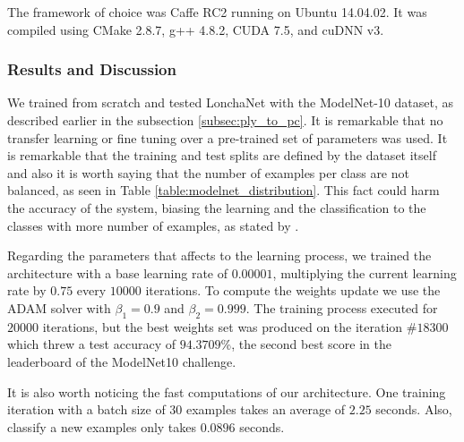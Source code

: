 The framework of choice was Caffe RC2 running on Ubuntu 14.04.02. It was compiled using CMake 2.8.7, g++ 4.8.2, CUDA 7.5, and cuDNN v3.

\subsubsection{Results and Discussion}
\label{cha:objrecog:sec:lonchanet:subsec:experiments:subsubsec:results}

We trained from scratch and tested LonchaNet with the ModelNet-10 dataset, as described earlier in the subsection \ref{subsec:ply_to_pc}. It is remarkable that no transfer learning or fine tuning over a pre-trained set of parameters was used. It is remarkable that the training and test splits are defined by the dataset itself and also it is worth saying that the number of examples per class are not balanced, as seen in Table \ref{table:modelnet_distribution}. This fact could harm the accuracy of the system, biasing the learning and the classification to the classes with more number of examples, as stated by \cite{He2009}.

Regarding the parameters that affects to the learning process, we trained the architecture with a base learning rate of $0.00001$, multiplying the current learning rate by $0.75$ every $10000$ iterations. To compute the weights update we use the ADAM \cite{KingmaB14} solver with $\beta_1=0.9$ and $\beta_2=0.999$. The training process executed for $20000$ iterations, but the best weights set was produced on the iteration $\#18300$ which threw a test accuracy of $94.3709$\%, the second best score in the leaderboard of the ModelNet10 challenge.

It is also worth noticing the fast computations of our architecture. One training iteration with a batch size of $30$ examples takes an average of $2.25$ seconds. Also, classify a new examples only takes $0.0896$ seconds.


